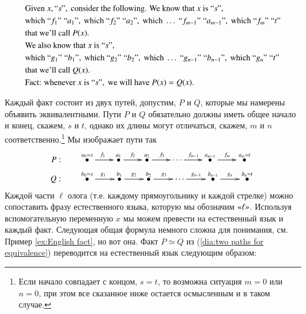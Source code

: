 \documentclass[a4paper]{book}
\def\tn{\textnormal}
\newcommand{\qtE}[1]{\tn{“}#1\tn{”}}
\newcommand{\qtR}[1]{\tn{«}#1\tn{»}}
\def\hsp{\hspace{.3in}}
\newcommand{\LMO}[1]{\stackrel{#1}{\bullet}}
\theoremstyle{myth}
\begin{document}
\begin{english}
\begin{align}\label{dia:Englishification}\index{Englishification}
&\tn{Given }x,\qtE{s},\tn{ consider the following. We know that }x\tn{ is }\qtE{s}, \\
\nonumber&\tn{which } \qtE{f_1}\;\qtE{a_1}, \tn{ which } \qtE{f_2}\;\qtE{a_2}, \tn{ which }\ldots \; \qtE{f_{m-1}}\;\qtE{a_{m-1}}, \tn{ which } \qtE{f_m}\;\qtE{t}\\
\nonumber&\tn{that we'll call } P(x).\\
\nonumber&\tn{We also know that }x\tn{ is } \qtE{s},\\
\nonumber&\tn{which } \qtE{g_1}\;\qtE{b_1}, \tn{ which }\qtE{g_2}\;\qtE{b_2}, \tn{ which }\ldots\;\qtE{g_{n-1}}\;\qtE{b_{n-1}}, \tn{ which } \qtE{g_n}\;\qtE{t}\\
\nonumber&\tn{that we'll call } Q(x).\\
\nonumber&\tn{Fact: whenever }x\tn{ is }\qtE{s},\tn{ we will have }P(x)=Q(x).
\end{align}

\begin{russian}Каждый факт состоит из двух путей, допустим, $P$ и $Q$, которые мы намерены объявить эквивалентными. Пути $P$ и $Q$ обязательно должны иметь общее начало и конец, скажем, $s$ и $t$, однако их длины могут отличаться, скажем, $m$ и $n$ соответственно.\footnote{Если начало совпадает с концом, $s=t$, то возможна ситуация $m=0$ или $n=0$, при этом все сказанное ниже остается осмысленным и в таком случае.} 
Мы изображает пути так 
\begin{align}\label{dia:two paths for equivalence}
P:&\hsp\xymatrix@=22pt{\LMO{a_0=s}\ar[r]^{f_1}&\LMO{a_1}\ar[r]^{f_2}&\LMO{a_2}\ar[r]^{f_3}&\cdots\ar[r]^{f_{m-1}}&\LMO{a_{m-1}}\ar[r]^{f_m}&\LMO{a_m=t}}\\\nonumber
Q:&\hsp\xymatrix@=23pt{\LMO{b_0=s}\ar[r]^{g_1}&\LMO{b_1}\ar[r]^{g_2}&\LMO{b_2}\ar[r]^{g_3}&\cdots\ar[r]^{g_{n-1}}&\LMO{b_{n-1}}\ar[r]^{g_n}&\LMO{b_n=t}}
\end{align}
Каждой части $\ell$ олога (т.е. каждому прямоугольнику и каждой стрелке) можно сопоставить фразу естественного языка, которую мы обозначим $\qtR{\ell}$. Используя вспомогательную переменную $x$ мы можем превести на естественный язык и каждый факт. Следующая общая формула немного сложна для понимания, см. Пример \ref{ex:English fact}, но вот она. Факт $P\simeq Q$ из (\ref{dia:two paths for equivalence}) переводится на естественный язык следующим образом: \end{russian}


\end{english}
\end{document}
